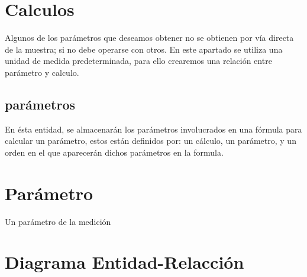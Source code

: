 \documentclass[a4paper,10pt]{article}
\begin{document}
\section{Calculos}
Algunos de los parámetros que deseamos obtener no se obtienen por vía directa de la muestra; si no debe operarse con otros. En este apartado se utiliza una unidad de medida predeterminada, para ello crearemos una relación entre parámetro y calculo.

\subsection{parámetros}
En ésta entidad, se almacenarán los parámetros involucrados en una fórmula para calcular un parámetro, estos están definidos por: un cálculo, un parámetro, y un orden en el que aparecerán dichos parámetros en la formula.

\section{Parámetro}
Un parámetro de la medición

\pagebreak

\section{Diagrama Entidad-Relacción}
\end{document}
